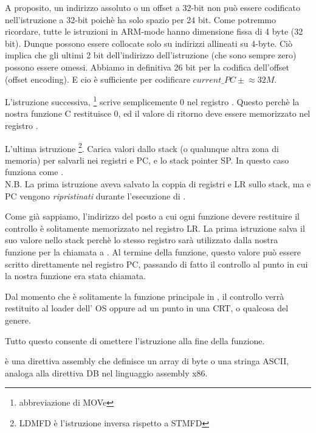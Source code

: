 A proposito, un indirizzo assoluto o un offset a 32-bit non può essere codificato nell'istruzione a 32-bit 
poichè ha solo spazio per 24 bit.
Come potremmo ricordare, tutte le istruzioni in ARM-mode hanno dimensione fissa di 4 byte (32 bit).
Dunque possono essere collocate solo su indirizzi allineati su 4-byte.
Ciò implica che gli ultimi 2 bit dell'indirizzo dell'istruzione (che sono sempre zero) possono essere omessi.
Abbiamo in definitiva 26 bit per la codifica dell'offset (offset encoding). E cio è sufficiente per codificare $current\_PC \pm{} \approx{}32M$.

L'istruzione successiva, \footnote{abbreviazione di MOVe} scrive semplicemente 0 nel registro .
Questo perchè la nostra funzione C restituisce 0, ed il valore di ritorno deve essere memorizzato nel registro .

L'ultima istruzione \footnote{\ac{LDMFD} è l'istruzione inversa rispetto a \ac{STMFD}}.
Carica valori dallo stack (o qualunque altra zona di memoria) per salvarli nei registri  e \ac{PC}, e  lo \gls{stack pointer} \ac{SP}.
In questo caso funziona come \POP.\\
N.B. La prima istruzione  aveva salvato la coppia di registri  e \ac{LR} sullo stack, ma  e \ac{PC} vengono \emph{ripristinati} durante l'esecuzione di .

Come già sappiamo, l'indirizzo del posto a cui ogni funzione devere restituire il controllo è solitamente memorizzato nel registro \ac{LR}.
La prima istruzione salva il suo valore nello stack perchè lo stesso registro sarà utilizzato dalla nostra funzione
\main per la chiamata a \printf.
Al termine della funzione, questo valore può essere scritto direttamente nel registro \ac{PC}, passando di fatto il controllo al punto in cui la nostra funzione era stata chiamata.

Dal momento che \main è solitamente la funzione principale in \CCpp,
il controllo verrà restituito al loader dell' \ac{OS} oppure ad un punto in una \ac{CRT},
o qualcosa del genere.

Tutto questo consente di omettere l'istruzione  alla fine della funzione.

 è una direttiva assembly che definisce un array di byte o una stringa ASCII, analoga alla direttiva DB
nel linguaggio assembly x86.
